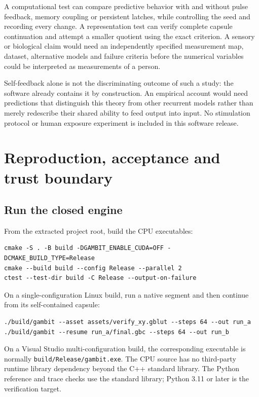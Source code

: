 \documentclass[11pt,a4paper]{article}
\begin{document}
A computational test can compare predictive behavior with and without
pulse feedback, memory coupling or persistent latches, while controlling
the seed and recording every change. A representation test can verify
complete capsule continuation and attempt a smaller quotient using the
exact criterion. A sensory or biological claim would need an
independently specified measurement map, dataset, alternative models and
failure criteria before the numerical variables could be interpreted as
measurements of a person.

Self-feedback alone is not the discriminating outcome of such a study:
the software already contains it by construction. An empirical account
would need predictions that distinguish this theory from other recurrent
models rather than merely redescribe their shared ability to feed output
into input. No stimulation protocol or human exposure experiment is
included in this software release.

\section{Reproduction, acceptance and trust
boundary}\label{reproduction-acceptance-and-trust-boundary}

\subsection{Run the closed engine}\label{run-the-closed-engine}

From the extracted project root, build the CPU executables:

\begin{verbatim}
cmake -S . -B build -DGAMBIT_ENABLE_CUDA=OFF -DCMAKE_BUILD_TYPE=Release
cmake --build build --config Release --parallel 2
ctest --test-dir build -C Release --output-on-failure
\end{verbatim}

On a single-configuration Linux build, run a native segment and then
continue from its self-contained capsule:

\begin{verbatim}
./build/gambit --asset assets/verify_xy.gblut --steps 64 --out run_a
./build/gambit --resume run_a/final.gbc --steps 64 --out run_b
\end{verbatim}

On a Visual Studio multi-configuration build, the corresponding
executable is normally \texttt{build/Release/gambit.exe}. The CPU source
has no third-party runtime library dependency beyond the C++ standard
library. The Python reference and trace checks use the standard library;
Python 3.11 or later is the verification target.
\end{document}
